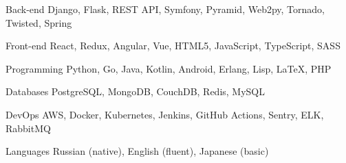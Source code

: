 

\begin{cvskills}

  \cvskill
    {Back-end} %
    {Django, Flask, REST API, Symfony, Pyramid, Web2py, Tornado, Twisted, Spring } %

  \cvskill
    {Front-end} %
    {React, Redux, Angular, Vue, HTML5, JavaScript, TypeScript, SASS} %

  \cvskill
    {Programming} %
    {Python, Go, Java, Kotlin, Android, Erlang, Lisp, LaTeX, PHP} %

  \cvskill
    {Databases} %
    {PostgreSQL, MongoDB, CouchDB, Redis, MySQL}

  \cvskill
    {DevOps} %
    {AWS, Docker, Kubernetes, Jenkins, GitHub Actions, Sentry, ELK, RabbitMQ} %

  \cvskill
    {Languages} %
    {Russian (native), English (fluent), Japanese (basic)} %

\end{cvskills}
